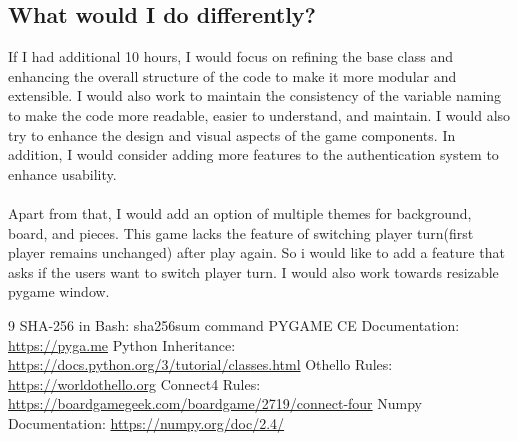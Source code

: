 \documentclass[12pt]{article}
\begin{document}
\subsection{What would I do differently?}
If I had additional 10 hours, I would focus on refining the base class and enhancing the overall structure of the code to make it more modular and extensible. I would also work to maintain the consistency of the variable naming to make the code more readable, easier to understand, and maintain. I would also try to enhance the design and visual aspects of the game components. In addition, I would consider adding more features to the authentication system to enhance usability.\\\\
Apart from that, I would add an option of multiple themes for background, board, and pieces. This game lacks the feature of switching player turn(first player remains unchanged) after play again. So i would like to add a feature that asks if the users want to switch player turn. I would also work towards resizable pygame window.

\newpage

\begin{thebibliography}{9}
 SHA-256 in Bash: sha256sum command
 PYGAME CE Documentation: \url{https://pyga.me}
 Python Inheritance: \url{https://docs.python.org/3/tutorial/classes.html}
Othello Rules: \url{https://worldothello.org}
Connect4 Rules: \url{https://boardgamegeek.com/boardgame/2719/connect-four}
Numpy Documentation: \url{https://numpy.org/doc/2.4/}
\end{thebibliography}
\end{document}
